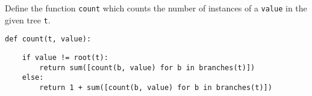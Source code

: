 \begin{blocksection}
\question Define the function \lstinline{count} which counts the number of instances of a \lstinline{value} in the given tree \lstinline{t}.

\begin{lstlisting}
def count(t, value):
\end{lstlisting}

\begin{solution}[1in]
\begin{lstlisting}
    if value != root(t):
        return sum([count(b, value) for b in branches(t)])
    else:
        return 1 + sum([count(b, value) for b in branches(t)])
\end{lstlisting}
\end{solution}
\end{blocksection}
